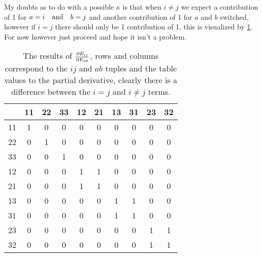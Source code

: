 \documentclass[11pt]{article}
\begin{document}
My doubts as to do with a possible $\kappa$ is that when $i\neq j$ we expect a contribution of 1 for $a=i\qq{and}b=j$ and another contribution of 1 for $a$ and $b$ switched, however if $i=j$ there should only be 1 contribution of 1, this is visualized by \cref{tab:devtable}.
For now however just proceed and hope it isn't a problem.
\begin{table}[H]
    \begin{center}
        \begin{tabular}{ c|c c c c c c c c c } 
               & 11 & 22 & 33 & 12 & 21 & 13 & 31 & 23 & 32 \\
            \hline
            11 & 1  &  0 &  0 &  0 &  0 &  0 &  0 &  0 &  0 \\
            22 & 0  &  1 &  0 &  0 &  0 &  0 &  0 &  0 &  0 \\
            33 & 0  &  0 &  1 &  0 &  0 &  0 &  0 &  0 &  0 \\
            12 & 0  &  0 &  0 &  1 &  1 &  0 &  0 &  0 &  0 \\
            21 & 0  &  0 &  0 &  1 &  1 &  0 &  0 &  0 &  0 \\
            13 & 0  &  0 &  0 &  0 &  0 &  1 &  1 &  0 &  0 \\
            31 & 0  &  0 &  0 &  0 &  0 &  1 &  1 &  0 &  0 \\
            23 & 0  &  0 &  0 &  0 &  0 &  0 &  0 &  1 &  1 \\
            32 & 0  &  0 &  0 &  0 &  0 &  0 &  0 &  1 &  1
        \end{tabular}
    \end{center}
    \caption{The results of $\pdv{E_{ij}}{E_{ab}}$, rows and columns correspond to the $ij$ and $ab$ tuples and the table values to the partial derivative, clearly there is a difference between the $i=j$ and $i\neq j$ terms.}\label{tab:devtable}
\end{table}
\end{document}
